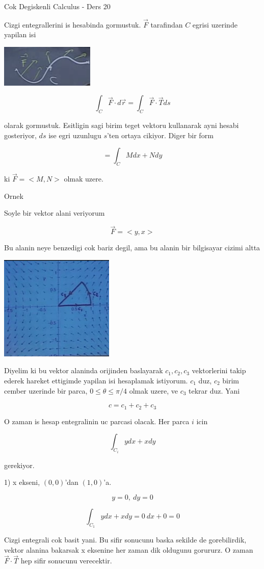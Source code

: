 \documentclass[12pt,fleqn]{article}
\begin{document}
Cok Degiskenli Calculus - Ders 20

Cizgi entegrallerini is hesabinda gormustuk. $\vec{F}$ tarafindan $C$
egrisi uzerinde yapilan isi

\includegraphics[height=2cm]{20_1.png}

\[ \int_C \vec{F} \cdot d\vec{r} =  \int_C \vec{F} \cdot \vec{T} ds \]

olarak gormustuk. Esitligin sagi birim teget vektoru kullanarak ayni hesabi
gosteriyor, $ds$ ise egri uzunlugu $s$'ten ortaya cikiyor. Diger bir form

\[ = \int_C M dx + N dy \]

ki $\vec{F} = <M,N>$ olmak uzere. 

Ornek 

Soyle bir vektor alani veriyorum

\[ \vec{F} = <y,x> \]

Bu alanin neye benzedigi cok bariz degil, ama bu alanin bir bilgisayar
cizimi altta

\includegraphics[height=5cm]{20_2.png}

Diyelim ki bu vektor alaninda orijinden baslayarak $c_1,c_2,c_3$
vektorlerini takip ederek hareket ettigimde yapilan isi hesaplamak
istiyorum. $c_1$ duz, $c_2$ birim cember uzerinde bir parca, $0 \le \theta
\le \pi / 4$ 
olmak uzere, ve $c_3$ tekrar duz. Yani 

\[ c = c_1 + c_2 + c_3 \]

O zaman is hesap entegralinin uc parcasi olacak. Her parca $i$ icin 

\[ \int_{C_i} y dx + x dy\]

gerekiyor. 

1) x ekseni, $(0,0)$'dan $(1,0)$'a. 

\[ y = 0, \ dy = 0 \]

\[ \int_{C_1} y dx + x dy = 0 \ dx + 0 = 0\]

Cizgi entegrali cok basit yani. Bu sifir sonucunu baska sekilde de
gorebilirdik, vektor alanina bakarsak x eksenine her zaman dik oldugunu
gorururz. O zaman $\vec{F}\cdot \vec{T}$ hep sifir sonucunu verecektir. 
\end{document}
